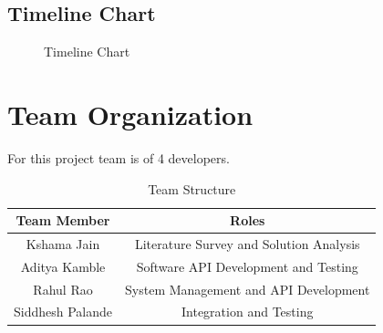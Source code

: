 \documentclass[oneside,a4paper,12pt]{report}
\begin{document}
\subsection{Timeline Chart}  
\begin{center}
	\begin{figure}[!htbp]
		\centering
	  \caption{Timeline Chart}
	  \label{fig:usecase}
	\end{figure}
\end{center}  
 
\section{Team Organization}
For this project team is of 4 developers. 
\begin{table}[!htbp]
\begin{center}
\def\arraystretch{1.5}
  \begin{tabular}{| c | c |}
       \hline
       
Team Member & Roles \\ \hline
Kshama Jain & Literature Survey and Solution Analysis \\ \hline
Aditya Kamble & Software API Development and Testing \\ \hline
Rahul Rao & System Management and API Development \\ \hline
Siddhesh Palande & Integration and Testing \\ \hline
       
\end{tabular}
 \caption { Team Structure }
 \label{tab:hreq}
\end{center}

\end{table}
\end{document}
